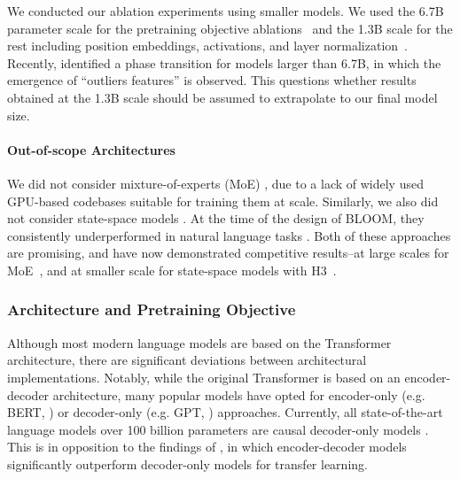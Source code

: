 \documentclass[twoside,11pt]{article}
\newcommand*\circled[1]{\tikz[baseline=(char.base)]{
            \node[shape=circle,draw,inner sep=2pt] (char) {#1};}}
\begin{document}
We conducted our ablation experiments using smaller models. We used the 6.7B parameter scale for the pretraining objective ablations~\citep{wang2022what} and the 1.3B scale for the rest including position embeddings, activations, and layer normalization~\citep{scao2022what}.
Recently, \citet{dettmers2022llm} identified a phase transition for models larger than 6.7B, in which the emergence of ``outliers features'' is observed. This questions whether results obtained at the 1.3B scale should be assumed to extrapolate to our final model size.

\paragraph{Out-of-scope Architectures}
We did not consider mixture-of-experts (MoE) \citep{shazeer2017}, due to a lack of widely used GPU-based codebases suitable for training them at scale. Similarly, we also did not consider state-space models \citep{gu2020hippo}. At the time of the design of BLOOM, they consistently underperformed in natural language tasks \citep{gu2021efficiently}. Both of these approaches are promising, and have now demonstrated competitive results--at large scales for MoE~\citep{fedus2022switch, srivastava2022beyond}, and at smaller scale for state-space models with H3~\citep{fu2023hungry}. 

\subsubsection{Architecture and Pretraining Objective}

Although most modern language models are based on the Transformer architecture, there are significant deviations between architectural implementations. Notably, while the original Transformer is based on an encoder-decoder architecture, many popular models have opted for encoder-only (e.g. BERT, \citep{devlin2019bert}) or decoder-only (e.g. GPT, \citep{radford2018improving}) approaches. Currently, all state-of-the-art language models over 100 billion parameters are causal decoder-only models \citep{brown2020language, rae2021scaling, chowdhery2022palm}. 
This is in opposition to the findings of \citet{raffel2020exploring}, in which encoder-decoder models significantly outperform decoder-only models for transfer learning.
\end{document}
